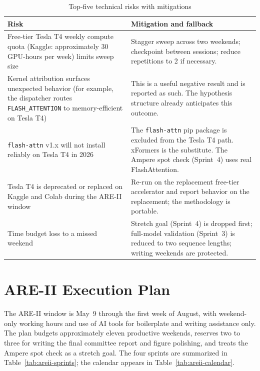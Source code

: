 \documentclass[11pt]{article}
\begin{document}
\begin{table}[h!]
\centering
\caption{Top-five technical risks with mitigations}
\label{tab:risks-summary}
\small
\begin{tabularx}{\textwidth}{p{4.2cm} X}
\toprule
\textbf{Risk} & \textbf{Mitigation and fallback} \\
\midrule
Free-tier Tesla T4 weekly compute quota (Kaggle: approximately 30 GPU-hours per week) limits sweep size & Stagger sweep across two weekends; checkpoint between sessions; reduce repetitions to 2 if necessary. \\
Kernel attribution surfaces unexpected behavior (for example, the dispatcher routes \texttt{FLASH\_ATTENTION} to memory-efficient on Tesla T4) & This is a useful negative result and is reported as such. The hypothesis structure already anticipates this outcome. \\
\texttt{flash-attn} v1.x will not install reliably on Tesla T4 in 2026~\parencite{flashattn_t4_issue887} & The \texttt{flash-attn} pip package is excluded from the Tesla T4 path. xFormers is the substitute. The Ampere spot check (Sprint~4) uses real FlashAttention. \\
Tesla T4 is deprecated or replaced on Kaggle and Colab during the ARE-II window & Re-run on the replacement free-tier accelerator and report behavior on the replacement; the methodology is portable. \\
Time budget loss to a missed weekend & Stretch goal (Sprint~4) is dropped first; full-model validation (Sprint~3) is reduced to two sequence lengths; writing weekends are protected. \\
\bottomrule
\end{tabularx}
\end{table}

\section{ARE-II Execution Plan}
\label{sec:areii-plan}

The ARE-II window is May~9 through the first week of August, with weekend-only working hours and use of AI tools for boilerplate and writing assistance only. The plan budgets approximately eleven productive weekends, reserves two to three for writing the final committee report and figure polishing, and treats the Ampere spot check as a stretch goal. The four sprints are summarized in Table~\ref{tab:areii-sprints}; the calendar appears in Table~\ref{tab:areii-calendar}.
\end{document}
